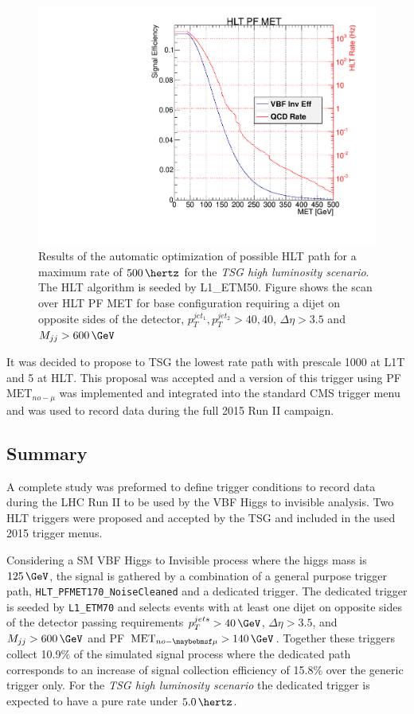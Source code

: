 \begin{figure}[!htp]%
\centering
\includegraphics[width=0.55\linewidth]{Chapter08/TriggerStudies/HLT/Systematics/L1ETM50_HLT_DijetVBF40_DEta3p5_MJJ600.pdf}
\caption{Results of the automatic optimization of possible \gls{HLT} path for a maximum rate of $500\,\hertz$ for the \textit{\gls{TSG} high luminosity scenario}. The \gls{HLT} algorithm is seeded by L1\_ETM50. Figure shows the scan over \gls{HLT} \gls{PF} \gls{MET} for base configuration requiring a dijet on opposite sides of the detector, $p_T^{jet_1},p_T^{jet_2}>40,40$, $\Delta\eta>3.5$ and $M_{jj}>600\,\GeV$}
\label{FIGURE:RunIITriggerStudies_SystematicsPath}
\end{figure}

It was decided to propose to \gls{TSG} the lowest rate path with prescale 1000 at \gls{L1T} and 5 at \gls{HLT}. This proposal was accepted and a version of this trigger using \gls{PF} $\text{MET}_{no-\mu}$ was implemented and integrated into the standard \gls{CMS} trigger menu and was used to record data during the full 2015 Run II campaign.

\subsection{Summary}
\label{SUBSECTION:RunIIPreparation_Summary}


A complete study was preformed to define trigger conditions to record data during the \gls{LHC} Run II to be used by the \gls{VBF} Higgs to invisible analysis. Two \gls{HLT} triggers were proposed and accepted by the \gls{TSG} and included in the used 2015 trigger menus. 

Considering a \gls{SM} \gls{VBF} Higgs to Invisible process where the higgs mass is $125\,\GeV$, the signal is gathered by a combination of a general purpose trigger path, \verb|HLT_PFMET170_NoiseCleaned| and a dedicated trigger. The dedicated trigger is seeded by \verb|L1_ETM70| and selects events with at least one dijet on opposite sides of the detector passing requirements $p_T^{jets}>40\,\GeV$, $\Delta\eta>3.5$, and $M_{jj}>600\,\GeV$ and \gls{PF} $\text{MET}_{no-\mu}>140\,\GeV$. Together these triggers collect 10.9\% of the simulated signal process where the dedicated path corresponds to an increase of signal collection efficiency of 15.8\% over the generic trigger only. For the \textit{\gls{TSG} high luminosity scenario} the dedicated trigger is expected to have a pure rate under $5.0\,\hertz$.

